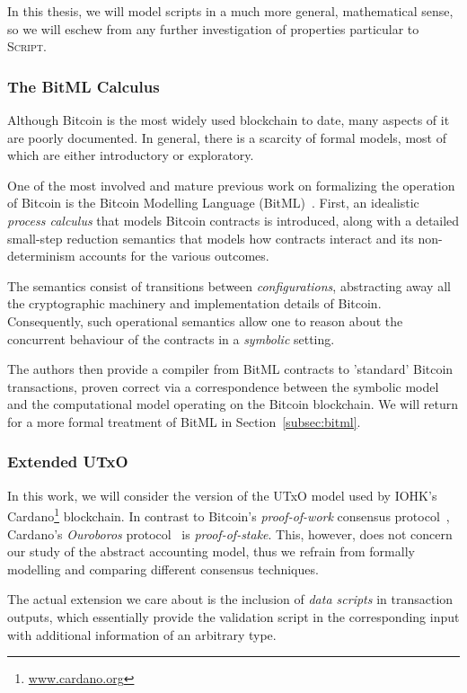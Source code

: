 \documentclass[acmsmall,nonacm=true,screen=true]{acmart}
\newcommand\site[1]{\footnote{\url{#1}}}
\begin{document}
In this thesis, we will model scripts in a much more general, mathematical sense, so
we will eschew from any further investigation of properties particular to \textsc{Script}.

\subsubsection{The BitML Calculus}
Although Bitcoin is the most widely used blockchain to date, many aspects of it are poorly documented.
In general, there is a scarcity of formal models, most of which are either introductory or exploratory.

One of the most involved and mature previous work on formalizing the operation of Bitcoin
is the Bitcoin Modelling Language (BitML)~\cite{bitml}. First, an idealistic \textit{process calculus}
that models Bitcoin contracts is introduced, along with a detailed small-step reduction semantics that
models how contracts interact and its non-determinism accounts for the various outcomes.

The semantics consist of transitions between \textit{configurations}, abstracting away all the
cryptographic machinery and implementation details of Bitcoin.
Consequently, such operational semantics allow one to reason about the concurrent behaviour of
the contracts in a \textit{symbolic} setting.

The authors then provide a compiler from BitML contracts to 'standard' Bitcoin transactions, proven
correct via a correspondence between the symbolic model and the computational model operating on
the Bitcoin blockchain. We will return for a more formal treatment of BitML in Section~\ref{subsec:bitml}.

\subsubsection{Extended UTxO}
In this work, we will consider the version of the UTxO model used by IOHK's Cardano\site{www.cardano.org} blockchain.
In contrast to Bitcoin's \textit{proof-of-work} consensus protocol~\cite{bitcoin}, 
Cardano's \textit{Ouroboros} protocol~\cite{ouroboros} is \textit{proof-of-stake}.
This, however, does not concern our study of the abstract accounting model, thus we
refrain from formally modelling and comparing different consensus techniques.

The actual extension we care about is the inclusion of \textit{data scripts} in transaction
outputs, which essentially provide the validation script in the corresponding input with additional
information of an arbitrary type.
\end{document}
